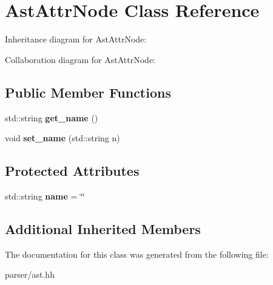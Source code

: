 \hypertarget{classAstAttrNode}{}\section{Ast\+Attr\+Node Class Reference}
\label{classAstAttrNode}


Inheritance diagram for Ast\+Attr\+Node\+:


Collaboration diagram for Ast\+Attr\+Node\+:
\subsection*{Public Member Functions}
\begin{DoxyCompactItemize}
\item 
\mbox{\label{classAstAttrNode_af01c68f0194dd4b0040129685829ebd7}} 
std\+::string {\bfseries get\+\_\+name} ()
\item 
\mbox{\label{classAstAttrNode_ac2569323f7b54e4a9c22f5cff275a6e8}} 
void {\bfseries set\+\_\+name} (std\+::string n)
\end{DoxyCompactItemize}
\subsection*{Protected Attributes}
\begin{DoxyCompactItemize}
\item 
\mbox{\label{classAstAttrNode_a3711184c7a1daf829802d3eb0d6ea87b}} 
std\+::string {\bfseries name} = \char`\"{}\char`\"{}
\end{DoxyCompactItemize}
\subsection*{Additional Inherited Members}


The documentation for this class was generated from the following file\+:\begin{DoxyCompactItemize}
\item 
parser/ast.\+hh\end{DoxyCompactItemize}
